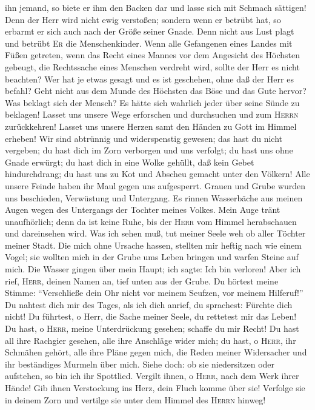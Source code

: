 ihn jemand, so biete er ihm den Backen dar und lasse sich mit Schmach
sättigen!  Denn der Herr wird nicht ewig verstoßen;
 sondern wenn er betrübt hat, so erbarmt er sich auch
nach der Größe seiner Gnade.  Denn nicht aus Lust plagt
und betrübt \textsc{Er} die Menschenkinder.  Wenn alle
Gefangenen eines Landes mit Füßen getreten,  wenn das
Recht eines Mannes vor dem Angesicht des Höchsten gebeugt,
 die Rechtssache eines Menschen verdreht wird, sollte der
Herr es nicht beachten?  Wer hat je etwas gesagt und es
ist geschehen, ohne daß der Herr es befahl?  Geht nicht
aus dem Munde des Höchsten das Böse und das Gute hervor? 
Was beklagt sich der Mensch? Es hätte sich wahrlich jeder über seine
Sünde zu beklagen!  Lasset uns unsere Wege erforschen und
durchsuchen und zum \textsc{Herrn} zurückkehren!  Lasset
uns unsere Herzen samt den Händen zu Gott im Himmel erheben!
 Wir sind abtrünnig und widerspenstig gewesen; das hast
du nicht vergeben;  du hast dich im Zorn verborgen und
uns verfolgt; du hast uns ohne Gnade erwürgt;  du hast
dich in eine Wolke gehüllt, daß kein Gebet hindurchdrang;
 du hast uns zu Kot und Abscheu gemacht unter den
Völkern!  Alle unsere Feinde haben ihr Maul gegen uns
aufgesperrt.  Grauen und Grube wurden uns beschieden,
Verwüstung und Untergang.  Es rinnen Wasserbäche aus
meinen Augen wegen des Untergangs der Tochter meines Volkes.
 Mein Auge tränt unaufhörlich; denn da ist keine Ruhe,
 bis der \textsc{Herr} vom Himmel herabschauen und
dareinsehen wird.  Was ich sehen muß, tut meiner Seele
weh ob aller Töchter meiner Stadt.  Die mich ohne Ursache
hassen, stellten mir heftig nach wie einem Vogel;  sie
wollten mich in der Grube ums Leben bringen und warfen Steine auf mich.
 Die Wasser gingen über mein Haupt; ich sagte: Ich bin
verloren!  Aber ich rief, \textsc{Herr}, deinen Namen an,
tief unten aus der Grube.  Du hörtest meine Stimme:
``Verschließe dein Ohr nicht vor meinem Seufzen, vor meinem Hilferuf!''
 Du nahtest dich mir des Tages, als ich dich anrief, du
sprachest: Fürchte dich nicht!  Du führtest, o Herr, die
Sache meiner Seele, du rettetest mir das Leben!  Du hast,
o \textsc{Herr}, meine Unterdrückung gesehen; schaffe du mir Recht!
 Du hast all ihre Rachgier gesehen, alle ihre Anschläge
wider mich;  du hast, o \textsc{Herr}, ihr Schmähen
gehört, alle ihre Pläne gegen mich,  die Reden meiner
Widersacher und ihr beständiges Murmeln über mich.  Siehe
doch: ob sie niedersitzen oder aufstehen, so bin ich ihr Spottlied.
 Vergilt ihnen, o \textsc{Herr}, nach dem Werk ihrer
Hände!  Gib ihnen Verstockung ins Herz, dein Fluch komme
über sie!  Verfolge sie in deinem Zorn und vertilge sie
unter dem Himmel des \textsc{Herrn} hinweg!

